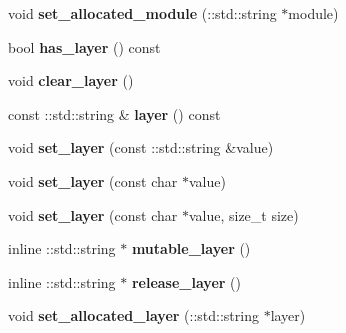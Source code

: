 \begin{DoxyCompactItemize}
void {\bfseries set\+\_\+allocated\+\_\+module} (\+::std\+::string $\ast$module)
\item 
\mbox{\label{classcaffe_1_1_python_parameter_ae2d7739570d99f0f0993ce0f82fb72f7}} 
bool {\bfseries has\+\_\+layer} () const
\item 
\mbox{\label{classcaffe_1_1_python_parameter_a193141ed915e3992453d9e6ebaf1b4a9}} 
void {\bfseries clear\+\_\+layer} ()
\item 
\mbox{\label{classcaffe_1_1_python_parameter_a8ee4c64790f1fddf797b80258f865937}} 
const \+::std\+::string \& {\bfseries layer} () const
\item 
\mbox{\label{classcaffe_1_1_python_parameter_aa946947c64778f40cfb6a1524ed0210f}} 
void {\bfseries set\+\_\+layer} (const \+::std\+::string \&value)
\item 
\mbox{\label{classcaffe_1_1_python_parameter_ac73e3774585bd27685df20a683af425b}} 
void {\bfseries set\+\_\+layer} (const char $\ast$value)
\item 
\mbox{\label{classcaffe_1_1_python_parameter_ae0e59c8d086913d21702a0ec48764641}} 
void {\bfseries set\+\_\+layer} (const char $\ast$value, size\+\_\+t size)
\item 
\mbox{\label{classcaffe_1_1_python_parameter_ac7315e124611558fdb14781002fed24d}} 
inline \+::std\+::string $\ast$ {\bfseries mutable\+\_\+layer} ()
\item 
\mbox{\label{classcaffe_1_1_python_parameter_a9dd7f065cb9fb1ed2d46bb101d4209a7}} 
inline \+::std\+::string $\ast$ {\bfseries release\+\_\+layer} ()
\item 
\mbox{\label{classcaffe_1_1_python_parameter_adb2f97905a6fa2bdc2eda042da67bec8}} 
void {\bfseries set\+\_\+allocated\+\_\+layer} (\+::std\+::string $\ast$layer)
\item 
\mbox{\label{classcaffe_1_1_python_parameter_aabf39ee2ee12f2f03cc5daf71952f8c6}} 

\end{DoxyCompactItemize}
